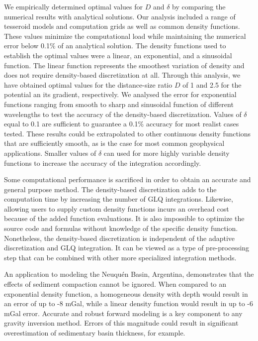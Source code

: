 \documentclass[extra, referee]{gji}
\begin{document}
We empirically determined optimal values for $D$ and $\delta$ by comparing the numerical
results with analytical solutions.
Our analysis included a range of tesseroid models and computation grids as well as
common density functions.
These values minimize the computational load while maintaining the numerical error below
0.1\% of an analytical solution.
The density functions used to establish the optimal values were a linear, an
exponential, and a sinusoidal function.
The linear function represents the smoothest variation of density and does not require
density-based discretization at all.
Through this analysis, we have obtained optimal values for the distance-size ratio $D$
of 1 and 2.5 for the potential an its gradient, respectively.
We analysed the error for exponential functions ranging from smooth to sharp and
sinusoidal function of different wavelengths to test the accuracy of the density-based
discretization.
Values of $\delta$ equal to 0.1 are sufficient to guarantee a 0.1\% accuracy for most
realist cases tested.
These results could be extrapolated to other continuous density functions that are
sufficiently smooth, as is the case for most common geophysical applications.
Smaller values of $\delta$ can used for more highly variable density functions to
increase the accuracy of the integration accordingly.

Some computational performance is sacrificed in order to obtain an accurate and general
purpose method.
The density-based discretization adds to the computation time by increasing
the number of GLQ integrations.
Likewise, allowing users to supply custom density functions incurs an overhead cost
because of the added function evaluations.
It is also impossible to optimize the source code and formulas without knowledge of the
specific density function.
Nonetheless, the density-based discretization is independent of the adaptive
discretization and GLQ integration.
It can be viewed as a type of pre-processing step that can be combined with other more
specialized integration methods.

An application to modeling the Neuqu\'en Basin, Argentina, demonstrates that the effects
of sediment compaction cannot be ignored.
When compared to an exponential density function, a homogeneous density with depth would
result in an error of up to -8 mGal, while a linear density function would result in up
to -6 mGal error.
Accurate and robust forward modeling is a key component to any gravity inversion method.
Errors of this magnitude could result in significant overestimation of sedimentary
basin thickness, for example.
\end{document}
